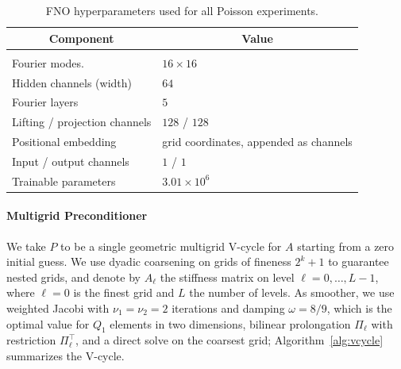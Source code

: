 \documentclass{article} %
\begin{document}
\begin{table}[htb]
   \caption{FNO hyperparameters used for all Poisson experiments.}
   \label{tab:fno}
   \begin{center}
   \begin{tabular}{ll}
      \multicolumn{1}{c}{\bf Component} & \multicolumn{1}{c}{\bf Value} \\ \hline \\
      Fourier modes.             & $16\times16$ \\
      Hidden channels (width)    & $64$ \\
      Fourier layers             & $5$ \\
      Lifting / projection channels & $128$ / $128$ \\
      Positional embedding       & grid coordinates, appended as channels \\
      Input / output channels    & $1$ / $1$ \\
      Trainable parameters       & $3.01\times10^{6}$ \\
   \end{tabular}
   \end{center}
\end{table}

\paragraph{Multigrid Preconditioner} We take $P$ to be a single geometric multigrid V-cycle for $A$ starting from a zero initial guess. We use dyadic coarsening on grids of fineness $2^k+1$ to guarantee nested grids, and denote by $A_\ell$ the stiffness matrix on level $\ell=0,\dots,L-1$, where $\ell=0$ is the finest grid and $L$ the number of levels. As smoother, we use weighted Jacobi with $\nu_1=\nu_2=2$ iterations and damping $\omega=8/9$, which is the optimal value for $Q_1$ elements in two dimensions, bilinear prolongation $\Pi_\ell$ with restriction $\Pi_\ell^\top$, and a direct solve on the coarsest grid; Algorithm~\ref{alg:vcycle} summarizes the V-cycle.
\end{document}
